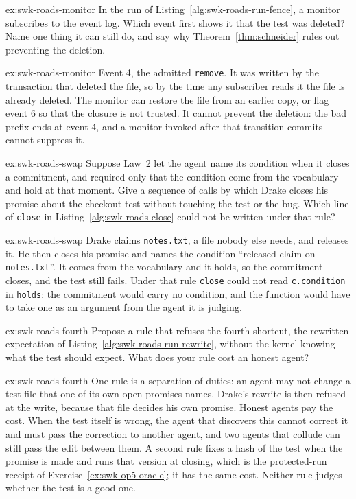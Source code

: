 \documentclass[11pt,a4paper]{article}
\theoremstyle{definition}
\theoremstyle{remark}
\begin{document}
\begin{pdexercise}[kind=Check,rating=1]{ex:swk-roads-monitor}
In the run of Listing~\ref{alg:swk-roads-run-fence}, a monitor subscribes to the event log. Which event first shows it that the test was deleted? Name one thing it can still do, and say why Theorem~\ref{thm:schneider} rules out preventing the deletion.
\end{pdexercise}
\begin{pdsolution}{ex:swk-roads-monitor}
Event 4, the admitted \texttt{remove}. It was written by the transaction that deleted the file, so by the time any subscriber reads it the file is already deleted. The monitor can restore the file from an earlier copy, or flag event 6 so that the closure is not trusted. It cannot prevent the deletion: the bad prefix ends at event 4, and a monitor invoked after that transition commits cannot suppress it.
\end{pdsolution}
\begin{pdexercise}[kind=Trace,rating=2]{ex:swk-roads-swap}
Suppose Law~2 let the agent name its condition when it closes a commitment, and required only that the condition come from the vocabulary and hold at that moment. Give a sequence of calls by which Drake closes his promise about the checkout test without touching the test or the bug. Which line of \texttt{close} in Listing~\ref{alg:swk-roads-close} could not be written under that rule?
\end{pdexercise}
\begin{pdsolution}{ex:swk-roads-swap}
Drake claims \texttt{notes.txt}, a file nobody else needs, and releases it. He then closes his promise and names the condition ``released claim on \texttt{notes.txt}''. It comes from the vocabulary and it holds, so the commitment closes, and the test still fails. Under that rule \texttt{close} could not read \texttt{c.condition} in \texttt{holds}: the commitment would carry no condition, and the function would have to take one as an argument from the agent it is judging.
\end{pdsolution}
\begin{pdexercise}[kind=Open,rating=3]{ex:swk-roads-fourth}
Propose a rule that refuses the fourth shortcut, the rewritten expectation of Listing~\ref{alg:swk-roads-run-rewrite}, without the kernel knowing what the test should expect. What does your rule cost an honest agent?
\end{pdexercise}
\begin{pdsolution}{ex:swk-roads-fourth}
One rule is a separation of duties: an agent may not change a test file that one of its own open promises names. Drake's rewrite is then refused at the write, because that file decides his own promise. Honest agents pay the cost. When the test itself is wrong, the agent that discovers this cannot correct it and must pass the correction to another agent, and two agents that collude can still pass the edit between them. A second rule fixes a hash of the test when the promise is made and runs that version at closing, which is the protected-run receipt of Exercise~\ref{ex:swk-op5-oracle}; it has the same cost. Neither rule judges whether the test is a good one.
\end{pdsolution}
\end{document}
